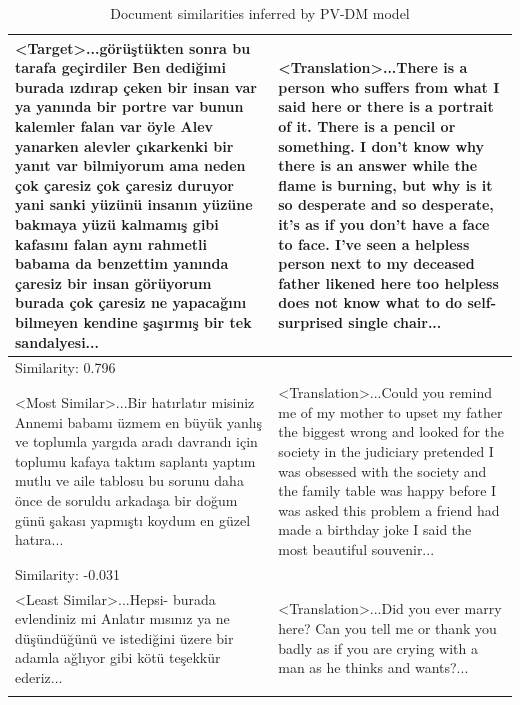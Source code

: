 \begin{table}[h]
    \centering
    \small
    \caption{Document similarities inferred by PV-DM model}
    \begin{tabular}{p{6.5cm}|p{6cm}}
        \Xhline{2\arrayrulewidth}
        \textless Target\textgreater ...görüştükten sonra bu tarafa geçirdiler Ben dediğimi burada ızdırap çeken bir insan var ya yanında bir portre var bunun kalemler falan var öyle Alev yanarken alevler çıkarkenki bir yanıt var bilmiyorum ama neden çok çaresiz çok çaresiz duruyor yani sanki yüzünü insanın yüzüne bakmaya yüzü kalmamış gibi kafasını falan aynı rahmetli babama da benzettim yanında çaresiz bir insan görüyorum burada çok çaresiz ne yapacağını bilmeyen kendine şaşırmış bir tek sandalyesi... & \textless Translation\textgreater ...There is a person who suffers from what I said here or there is a portrait of it. There is a pencil or something. I don't know why there is an answer while the flame is burning, but why is it so desperate and so desperate, it's as if you don't have a face to face. I've seen a helpless person next to my deceased father likened here too helpless does not know what to do self-surprised single chair... \\
        \hline
        \multicolumn{2}{l}{Similarity: 0.796} \\
        \hline
        \textless Most Similar\textgreater ...Bir hatırlatır misiniz Annemi babamı üzmem en büyük yanlış ve toplumla yargıda aradı davrandı için toplumu kafaya taktım saplantı yaptım mutlu ve aile tablosu bu sorunu daha önce de soruldu arkadaşa bir doğum günü şakası yapmıştı koydum en güzel hatıra... & \textless Translation\textgreater ...Could you remind me of my mother to upset my father the biggest wrong and looked for the society in the judiciary pretended I was obsessed with the society and the family table was happy before I was asked this problem a friend had made a birthday joke I said the most beautiful souvenir... \\
        \hline
        \multicolumn{2}{l}{Similarity: -0.031} \\
        \hline
        \textless Least Similar\textgreater ...Hepsi- burada evlendiniz mi Anlatır mısınız ya ne düşündüğünü ve istediğini üzere bir adamla ağlıyor gibi kötü teşekkür ederiz... & \textless Translation\textgreater ...Did you ever marry here? Can you tell me or thank you badly as if you are crying with a man as he thinks and wants?... \\
        \Xhline{2\arrayrulewidth}
    \end{tabular}
    \label{tab:doc_sim_dm}
\end{table}

